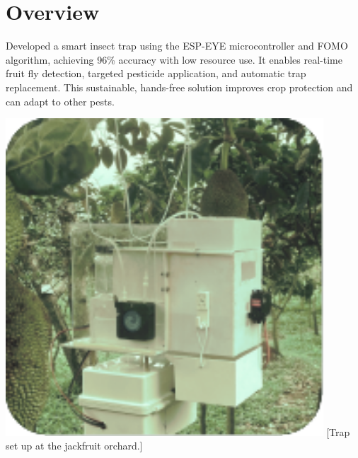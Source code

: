 \documentclass[../../main]{subfiles}
\begin{document}
\section{Overview} \label{sec:}

\begin{minipage} {0.62\textwidth}
    \vspace{-0.8cm}

    Developed a smart insect trap using the ESP-EYE microcontroller and FOMO
    algorithm, achieving 96\% accuracy with low resource use. It enables
    real-time fruit fly detection, targeted pesticide application, and
    automatic trap replacement. This sustainable, hands-free solution improves
    crop protection and can adapt to other pests.

\end{minipage}
\hfill
\begin{minipage} {0.35\textwidth}
    \begin{center}
        \vspace{-1.2cm}
        \includegraphics[width = 0.89\textwidth] {pics/trap.pdf}
        [Trap set up at the jackfruit orchard.]{}
        \label{fig:case3Pic}
    \end{center}
\end{minipage}
\end{document}
